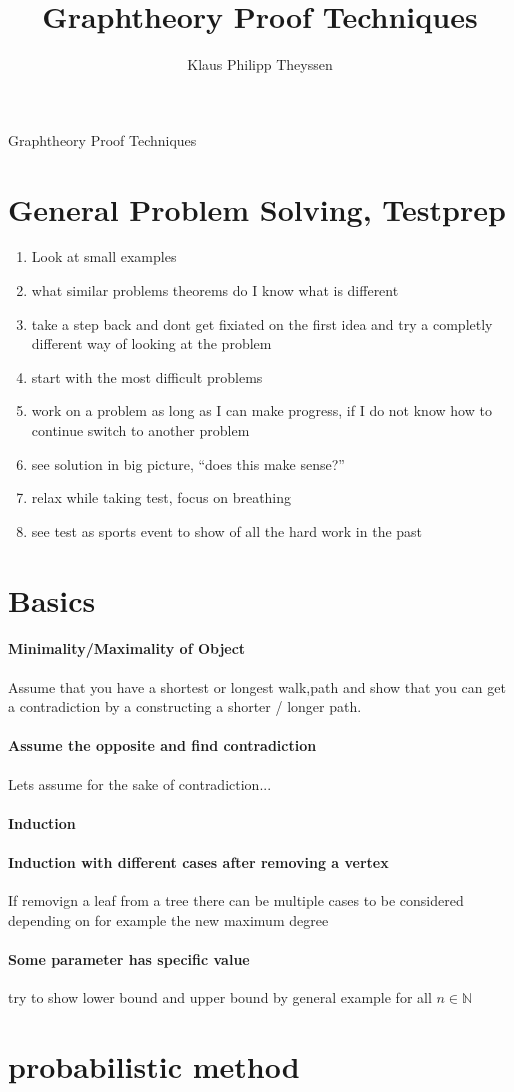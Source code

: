 \documentclass[a4paper]{article}
\title{Graphtheory Proof Techniques}
\author{Klaus Philipp Theyssen}
\begin{document}
\begin{center}
    \Large Graphtheory Proof Techniques
\end{center}


\section{General Problem Solving, Testprep}
\begin{enumerate}
    \item Look at small examples 
    \item what similar problems theorems do I know what is different
    \item take a step back and dont get fixiated on the first idea and try 
        a completly different way of looking at the problem
    \item start with the most difficult problems
    \item work on a problem as long as I can make progress, if I do not know
        how to continue switch to another problem
    \item see solution in big picture, \enquote{does this make sense?}
    \item relax while taking test, focus on breathing 
    \item see test as sports event to show of all the hard work in the past
\end{enumerate}


\section{Basics}
\paragraph{Minimality/Maximality of Object}
Assume that you have a shortest or longest walk,path and show that you can 
get a contradiction by a constructing a shorter / longer path.

\paragraph{Assume the opposite and find contradiction}
Lets assume for the sake of contradiction...

\paragraph{Induction}

\paragraph{Induction with different cases after removing a vertex}
If removign a leaf from a tree there can be multiple cases to be 
considered depending on for example the new maximum degree

\paragraph{Some parameter has specific value}
try to show lower bound and upper bound by general example for all
$ n \in \mathbb{N} $


\section{probabilistic method}
\end{document}
